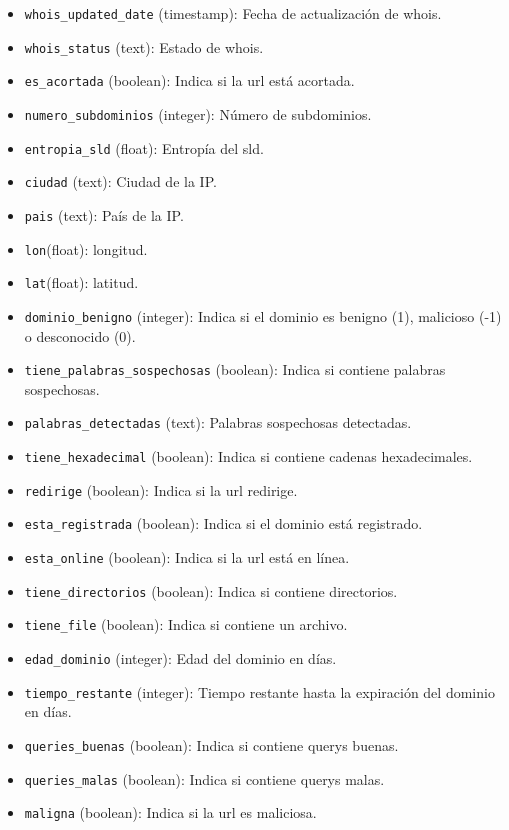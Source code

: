\begin{itemize}
    \item \texttt{whois\_updated\_date} (timestamp): Fecha de actualización de \gls{whois}.
    \item \texttt{whois\_status} (text): Estado de \gls{whois}.
    \item \texttt{es\_acortada} (boolean): Indica si la \gls{url} está acortada.
    \item \texttt{numero\_subdominios} (integer): Número de subdominios.
    \item \texttt{entropia\_sld} (float): Entropía del \gls{sld}.
    \item \texttt{ciudad} (text): Ciudad de la IP.
    \item \texttt{pais} (text): País de la IP.
    \item \texttt{lon}(float): longitud.
    \item \texttt{lat}(float): latitud.
    \item \texttt{dominio\_benigno} (integer): Indica si el dominio es benigno (1), malicioso (-1) o desconocido (0).
    \item \texttt{tiene\_palabras\_sospechosas} (boolean): Indica si contiene palabras sospechosas.
    \item \texttt{palabras\_detectadas} (text): Palabras sospechosas detectadas.
    \item \texttt{tiene\_hexadecimal} (boolean): Indica si contiene cadenas hexadecimales.
    \item \texttt{redirige} (boolean): Indica si la \gls{url} redirige.
    \item \texttt{esta\_registrada} (boolean): Indica si el dominio está registrado.
    \item \texttt{esta\_online} (boolean): Indica si la \gls{url} está en línea.
    \item \texttt{tiene\_directorios} (boolean): Indica si contiene directorios.
    \item \texttt{tiene\_file} (boolean): Indica si contiene un archivo.
    \item \texttt{edad\_dominio} (integer): Edad del dominio en días.
    \item \texttt{tiempo\_restante} (integer): Tiempo restante hasta la expiración del dominio en días.
    \item \texttt{queries\_buenas} (boolean): Indica si contiene \glspl{query} buenas.
    \item \texttt{queries\_malas} (boolean): Indica si contiene \glspl{query} malas.
    \item \texttt{maligna} (boolean): Indica si la \gls{url} es maliciosa.

\end{itemize}
